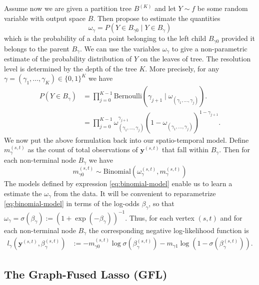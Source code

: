 \documentclass[a4paper, 11pt]{article}
\begin{document}
Assume now we are given a partition tree $B^{(K)}$ and let $Y \sim f$ be some random variable with output space $B$. Then \citet{tansey-etal-2017} propose to estimate the quantities
$$
\omega_\gamma = P(Y \in B_{\gamma0} \mid Y \in B_\gamma)
$$
which is the probability of a data point belonging to the left child $B_{\gamma0}$ provided it belongs to the parent $B_\gamma$. We can use the variables $\omega_\gamma$ to give a non-parametric estimate of the probability distribution of $Y$ on the leaves of tree. The resolution level is determined by the depth of the tree $K$. More precisely, for any $\gamma=(\gamma_1,\hdots,\gamma_K)\in\{0,1\}^K$ we have
\begin{equation}\label{eq:recover-probability}
\begin{aligned}
P(Y \in B_\gamma) &= \prod_{j=0}^{K-1} \mathrm{Bernoulli}\left(\gamma_{j+1} \mid \omega_{(\gamma_1,\hdots,\gamma_j)}\right).  \\
& = \prod_{j=0}^{K-1} \omega_{(\gamma_1,\hdots,\gamma_j)}^{\gamma_{j+1}}\left(1 - \omega_{(\gamma_1,\hdots,\gamma_j)}\right)^{1 - \gamma_{j+1}}.
\end{aligned}
\end{equation}
We now put the above formulation back into our spatio-temporal model. Define $m^{(s,t)}_\gamma$ as the count of total observations of $\mathbf{y}^{(s,t)}$ that fall within $B_\gamma$. Then for each non-terminal node $B_\gamma$ we have
\begin{equation}\label{eq:binomial-model}
m_{\gamma0}^{(s,t)} \sim \mathrm{Binomial}(\omega^{(s,t)}_\gamma, m_\gamma^{(s,t)})
\end{equation}
The models defined by expression \eqref{eq:binomial-model} enable us to learn a estimate the $\omega_\gamma$ from the data. It will be convenient to reparametrize \eqref{eq:binomial-model} in terms of the log-odds $\beta_\gamma$, so that $\omega_\gamma = \sigma(\beta_\gamma) := (1 + \exp(-\beta_\gamma))^{-1}$. Thus, for each vertex $(s,t)$ and for each non-terminal node $B_\gamma$ the corresponding negative log-likelihood function is
\begin{equation}\label{eq:loglikelihood}
\begin{aligned}
l_\gamma(\mathbf{y}^{(s,t)}, \beta_\gamma^{(s,t)}) & := - m_{\gamma0}^{(s,t)}\log \sigma(\beta^{(s,t)}_\gamma) - m_{\gamma1} \log (1 - \sigma(\beta^{(s,t)}_\gamma)). 
\end{aligned}    
\end{equation}

\subsection{The Graph-Fused Lasso (GFL)}\label{sec:gfl}
\end{document}
